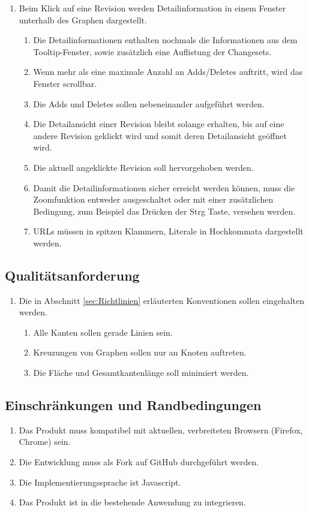 \documentclass[nocolor]{tudbook}
\begin{document}
\begin{enumerate}[F1]
\begin{enumerate}[{F2}.1]
	\end{enumerate}
\item Beim Klick auf eine Revision werden Detailinformation in einem Fenster unterhalb des Graphen dargestellt.
	\begin{enumerate}[{F3}.1]	
	\item Die Detailinformationen enthalten nochmals die Informationen aus dem Tooltip-Fenster, sowie zusätzlich eine Auflistung der Changesets.
	\item Wenn mehr als eine maximale Anzahl an Adds/Deletes auftritt, wird das Fenster scrollbar.
	\item Die Adds und Deletes sollen nebeneinander aufgeführt werden.
	\item Die Detailansicht einer Revision bleibt solange erhalten, bis auf eine andere Revision geklickt wird und somit deren Detailansicht geöffnet wird.
	\item Die aktuell angeklickte Revision soll hervorgehoben werden.
	\item Damit die Detailinformationen sicher erreicht werden können, muss die Zoomfunktion entweder ausgeschaltet oder mit einer zusätzlichen Bedingung, zum Beispiel das Drücken der \glqq Strg\grqq{} Taste, versehen werden. 
	\item URLs müssen in spitzen Klammern, Literale in Hochkommata dargestellt werden.
	\end{enumerate}
\end{enumerate}

\subsection{Qualitätsanforderung}
\begin{enumerate}[Q1]
	\item Die in Abschnitt \ref{sec:Richtlinien} erläuterten Konventionen sollen eingehalten werden.
	\begin{enumerate}[{Q1}.1]
		\item Alle Kanten sollen gerade Linien sein.
		\item Kreuzungen von Graphen sollen nur an Knoten auftreten.
		\item Die Fläche und Gesamtkantenlänge soll minimiert werden.
	\end{enumerate}
\end{enumerate}

\subsection{Einschränkungen und Randbedingungen}
\begin{enumerate}[R1]
	\item Das Produkt muss kompatibel mit aktuellen, verbreiteten Browsern (Firefox, Chrome) sein.
	\item Die Entwicklung muss als Fork auf GitHub durchgeführt werden.
	\item Die Implementierungssprache ist Javascript.
	\item Das Produkt ist in die bestehende Anwendung zu integrieren.
\end{enumerate}
\end{document}
